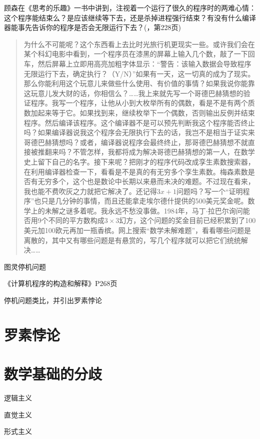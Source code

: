 \documentclass{article}
\begin{document}
顾森在《思考的乐趣》一书中讲到，注视着一个运行了很久的程序时的两难心情：这个程序能结束么？是应该继续等下去，还是杀掉进程强行结束？有没有什么编译器能事先告诉你的程序是否会无限运行下去？(\cite{GuSen-2012}，第228页)

\begin{quotation}
为什么不可能呢？这个东西看上去比时光旅行机更现实一些。或许我们会在某个科幻电影中看到，一个程序员在漆黑的屏幕上输入几个数，敲了一下回车，然后屏幕上立即用高亮加粗字体显示：“警告：该输入数据会导致程序无限运行下去，确定执行？（Y/N）”如果有一天，这一切真的成为了现实。那么你能利用这个玩意儿来做些什么使用、有价值的事情？如果我说你能靠这玩意儿发大财的话，你相信么？……我上来就先写一个哥德巴赫猜想的验证程序。我写一个程序，让他从小到大枚举所有的偶数，看是不是有两个质数加起来等于它。如果找到来，继续枚举下一个偶数，否则输出反例并结束程序。然后编译该程序。这个编译器不是可以预先判断我这个程序能否终止吗？如果编译器说我这个程序会无限执行下去的话，我岂不是相当于证实来哥德巴赫猜想吗？或者，编译器说程序会最终终止，那哥德巴赫猜想不就直接被推翻来吗？不管怎样，我都将成为解决哥德巴赫猜想的第一人，在数学史上留下自己的名字。接下来呢？把刚才的程序代码改成孪生素数搜索器，在利用编译器检查一下，看看是不是真的有无穷多个孪生素数。梅森素数是否有无穷多个，这个也是数论中长期以来悬而未决的难题。不过现在看来，我也能不费吹灰之力就把它解决了。还记得$3x+1$问题吗？写一个“证明程序”也只是几分钟的事情，而且还能拿走埃尔德什提供的500美元奖金呢。数学上的未解之谜多着呢。我永远不愁没事做。1984年，马丁$\cdot$拉巴尔询问能否用9个不同的平方数构成$3 \times 3$幻方，这个问题的奖金目前已经积累到了100美元加100欧元再加一瓶香槟。网上搜索“数学未解难题”，看看哪些问题是离散的，其中又有哪些问题是有悬赏的，写几个程序就可以把它们统统解决……
\end{quotation}

图灵停机问题

《计算机程序的构造和解释》P268页

停机问题类比，并引出罗素悖论

\section{罗素悖论}

\section{数学基础的分歧}

逻辑主义

直觉主义

形式主义
\end{document}
